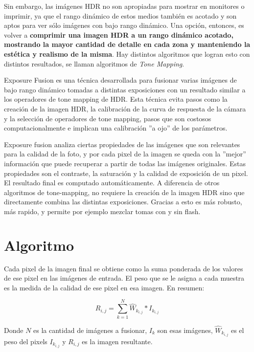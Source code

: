 \documentclass[a4paper,10pt]{article}
\begin{document}
        Sin embargo, las imágenes HDR no son apropiadas para mostrar en monitores o imprimir, ya que el rango dinámico de estos medios también es acotado y son aptos para ver sólo imágenes con bajo rango dinámico. Una opción, entonces, es volver a \textbf{comprimir una imagen HDR a un rango dinámico acotado, mostrando la mayor cantidad de detalle en cada zona y manteniendo la estética y realismo de la misma}. Hay distintos algoritmos que logran esto con distintos resultados, se llaman algoritmos de \emph{Tone Mapping}.

        Exposure Fusion \cite{DBLP:conf/pg/MertensKR07} es una técnica desarrollada para fusionar varias imágenes de bajo rango dinámico tomadas a distintas exposiciones  con un resultado similar a los operadores de tone mapping de HDR. Esta técnica evita pasos como la creación de la imagen HDR, la calibración de la curva de respuesta de la cámara y la selección de operadores de tone mapping, pasos que son costosos computacionalmente e implican una calibración ''a ojo'' de los parámetros.
        
        Exposure fusion analiza ciertas propiedades de las imágenes que son relevantes para la calidad de la foto, y por cada pixel de la imagen se queda con la ''mejor'' información que puede recuperar a partir de todas las imágenes originales. Estas propiedades son el contraste, la saturación y la calidad de exposición de un pixel. El resultado final es computado automáticamente. A diferencia de otros algoritmos de tone-mapping, no requiere la creación de la imagen HDR sino que directamente combina las distintas exposiciones. Gracias a esto es más robusto, más rapido, y permite por ejemplo mezclar tomas con y sin flash.

    \section{Algoritmo}

        Cada pixel de la imagen final se obtiene como la suma ponderada de los valores de ese pixel en las imágenes de entrada. El peso que se le asigna a cada muestra es la medida de la calidad de ese pixel en esa imagen. En resumen:

        $$ R_{i,j} = \sum_{k=1}^N{ \hat{W}_{k_{i,j}}*I_{k_{i,j}} } $$

        Donde $N$ es la cantidad de imágenes a fusionar, $I_k$ son esas imágenes, $\hat{W}_{k_{i,j}}$ es el peso del pixels $I_{k_{i,j}}$ y $R_{i,j}$ es la imagen resultante.
\end{document}
